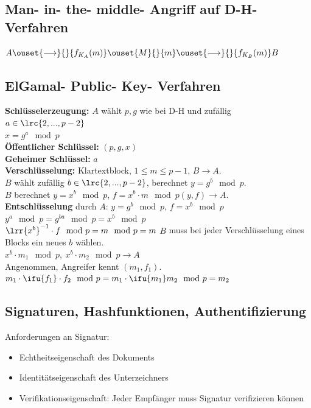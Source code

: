  \subsection{Man- in- the- middle- Angriff auf D-H- Verfahren}

  $A\ouset{\longrightarrow}{}{f_{K_A}(m)}\ouset{M}{}{m}
  \ouset{\longrightarrow}{}{f_{K_B}(m)} B$

  \subsection{ElGamal- Public- Key- Verfahren}
    \textbf{Schlüsselerzeugung:} $A$ wählt $p,g$ wie bei D-H und zufällig
    $a\in\lrc{2,...,p-2}$\\
    $x=g^a\mod p$\\
    \textbf{Öffentlicher Schlüssel:} $(p,g,x)$\\
    \textbf{Geheimer Schlüssel:} $a$\\
    \textbf{Verschlüsselung:} Klartextblock, $1\leq m\leq p-1$, $B\rightarrow A$.\\
    $B$ wählt zufällig $b\in\lrc{2,...,p-2}$, berechnet $y=g^b\mod p$.\\
    $B$ berechnet $y=x^b\mod p$, $f=x^b\cdot m\mod p$\quad $(y,f)\rightarrow
    A$.\\
    \textbf{Entschlüsselung} durch $A$: $y=g^b\mod p$, $f=x^b\mod p$\\
    $y^a\mod p=g^{ba}\mod p=x^b\mod p$\\
    $\lrr{x^b}^{-1}\cdot f\mod p=m\mod p=m$
    $B$ muss bei jeder Verschlüsselung eines Blocks ein neues $b$ wählen.\\
    $x^b\cdot m_1\mod p,\ x^b\cdot m_2\mod p\longrightarrow A$\\
    Angenommen, Angreifer kennt $(m_1,f_1)$. $m_1\cdot\ifu{f_1}\cdot f_2\mod p
    =m_1\cdot\ifu{m_1}m_2\mod p=m_2$

  \subsection{Signaturen, Hashfunktionen, Authentifizierung}
    Anforderungen an Signatur:
    \begin{itemize}[-]
      \item Echtheitseigenschaft des Dokuments
      \item Identitätseigenschaft des Unterzeichners
      \item Verifikationseigenschaft: Jeder Empfänger muss Signatur
        verifizieren können
    \end{itemize}

